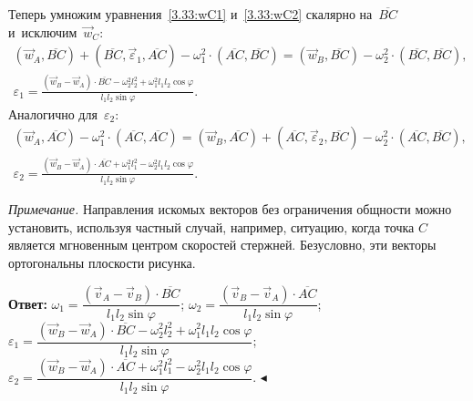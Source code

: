 \documentclass{weekly}
\begin{document}
Теперь умножим уравнения~\eqref{3.33:wC1} и~\eqref{3.33:wC2}
скалярно на~$\overline{BC}$ и~исключим~$\vec w_C$:
\begin{gather}
    \left(\vec w_A, \overline{BC}\right) +
            \left(\overline{BC}, \vec\varepsilon_1,
            \overline{AC}\right) -
            \omega_1^2 \cdot \left(\overline{AC}, \overline{BC}\right)
        = \left(\vec w_B, \overline{BC}\right) %
            - \omega_2^2 \cdot \left(\overline{BC},
            \overline{BC}\right), \\
    \varepsilon_1 = \frac{\left(\vec w_B - \vec w_A\right) \cdot
            \overline{BC} - \omega_2^2 l_2^2 +
            \omega_1^2 l_1 l_2 \cos\varphi}{l_1 l_2 \sin\varphi}.
\end{gather}
Аналогично для~$\varepsilon_2$:
\begin{gather}
    \left(\vec w_A, \overline{AC}\right) %
            - \omega_1^2 \cdot \left(\overline{AC}, \overline{AC}\right)
        = \left(\vec w_B, \overline{AC}\right) +
            \left(\overline{AC}, \vec\varepsilon_2,
            \overline{BC}\right) -
            \omega_2^2 \cdot \left(\overline{AC},
            \overline{BC}\right), \\
    \varepsilon_2 = \frac{\left(\vec w_B - \vec w_A\right) \cdot
            \overline{AC} + \omega_1^2 l_1^2 -
            \omega_2^2 l_1 l_2 \cos\varphi}{l_1 l_2 \sin\varphi}.
\end{gather}

\textsl{Примечание.} Направления искомых векторов
без ограничения общности можно установить,
используя частный случай, например, ситуацию, когда
точка $C$ является мгновенным центром скоростей стержней.
Безусловно, эти векторы ортогональны плоскости рисунка.

\textbf{Ответ:}\quad
$\omega_1 = \dfrac{\left(\vec v_A - \vec v_B\right)\cdot\overline{BC}}
    {l_1 l_2 \sin\varphi}$;\qquad
$\omega_2 = \dfrac{\left(\vec v_B - \vec v_A\right)\cdot\overline{AC}}
    {l_1 l_2 \sin\varphi}$;\\[1.5ex]
$\varepsilon_1 = \dfrac{\left(\vec w_B - \vec w_A\right) \cdot
    \overline{BC} - \omega_2^2 l_2^2 +
    \omega_1^2 l_1 l_2 \cos\varphi}{l_1 l_2 \sin\varphi}$;\qquad
$\varepsilon_2 = \dfrac{\left(\vec w_B - \vec w_A\right) \cdot
    \overline{AC} + \omega_1^2 l_1^2 -
    \omega_2^2 l_1 l_2 \cos\varphi}{l_1 l_2 \sin\varphi}$.
\hfill $\blacktriangleleft$
\end{document}
